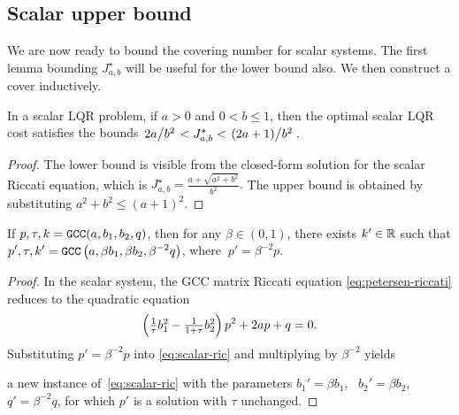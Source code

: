 \subsection{Scalar upper bound}

We are now ready to bound the covering number for scalar systems.
The first lemma bounding $J^\star_{a,b}$ will be useful for the lower bound also.
We then construct a cover inductively.

\begin{lemma}
\label{lem:scalar-cost-ub}
	In a scalar LQR problem,
	if $a > 0$ and $0 < b \leq 1$,
	then the optimal scalar LQR cost satisfies the bounds
	\(
		\left. 2a \middle/ b^2 \right.
		<
		J^\star_{a,b}
		<
		\left. (2a + 1) \middle/ b^2 \right..
	\)
\end{lemma}
\begin{proof}
	The lower bound is visible from
	the closed-form solution for the scalar Riccati equation, which is
	\(
		J^\star_{a,b} = \frac{a + \sqrt{a^2 + b^2}}{b^2}.
	\)
	The upper bound is obtained by substituting $a^2 + b^2 \leq (a + 1)^2$.
\end{proof}

\begin{lemma}
\label{lem:scalar-cover-recursion}
	If $p, \tau, k = {\normalfont \texttt{GCC}}(a, b_1, b_2, q)$,
	then for any $\beta \in (0, 1)$,
	there exists $k' \in \mathbb{R}$
	such that
	$\displaystyle p', \tau, k' = {\normalfont \texttt{GCC}} \left( a, \beta b_1, \beta b_2, \beta^{-2} q \right)$,
	where $\ p' = \beta^{-2} p$.%
\end{lemma}
\begin{proof}
	In the scalar system,
	the GCC matrix Riccati equation \eqref{eq:petersen-riccati}
	reduces to the quadratic equation
	\begin{equation}
	\label{eq:scalar-ric}
		\left(
			\textstyle \frac{1}{\tau} b_1^2
			- \frac{1}{1 + \tau} b_2^2
		\right)
		p^2
		+ 2a p
		+ q
		= 0.
	\end{equation}
	Substituting $p' = \beta^{-2} p$ into \eqref{eq:scalar-ric}
	and multiplying by $\beta^{-2}$ yields
	
	a new instance of~\eqref{eq:scalar-ric}
	with the parameters
		$b_1' = \beta b_1$, \ 
		$b_2' = \beta b_2$, \ 
		$q' = \beta^{-2} q$,
	for which $p'$ is a solution
	with $\tau$ unchanged.
\end{proof}


